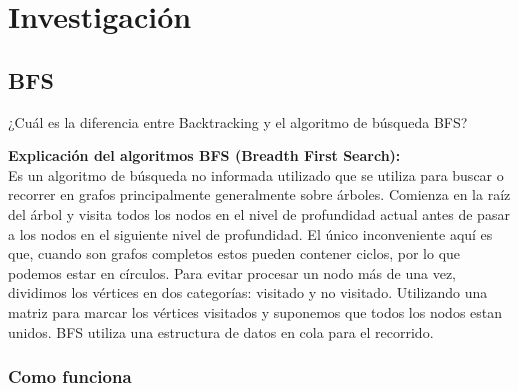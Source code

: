 \section{Investigación} 


\subsection{BFS}
\begin{center}
    ¿Cuál es la diferencia entre Backtracking y el algoritmo de búsqueda BFS?
\end{center}



\noindent \textbf{\large{Explicación del algoritmos BFS (Breadth First Search):}}\\ 


Es un algoritmo de búsqueda no informada utilizado que se utiliza para buscar o recorrer
en grafos principalmente generalmente sobre árboles. Comienza en la raíz del árbol 
y visita todos los nodos en el nivel de profundidad actual antes de pasar a los 
nodos en el siguiente nivel de profundidad. El único inconveniente aquí es que,
cuando son grafos completos estos pueden contener ciclos, por lo que podemos estar en 
círculos. Para evitar procesar un nodo más de una vez, dividimos los vértices en 
dos categorías: visitado y no visitado. Utilizando una matriz para marcar los vértices 
visitados y suponemos que todos los nodos estan unidos. BFS utiliza una estructura
de datos en cola para el recorrido.

\subsubsection*{Como funciona }

